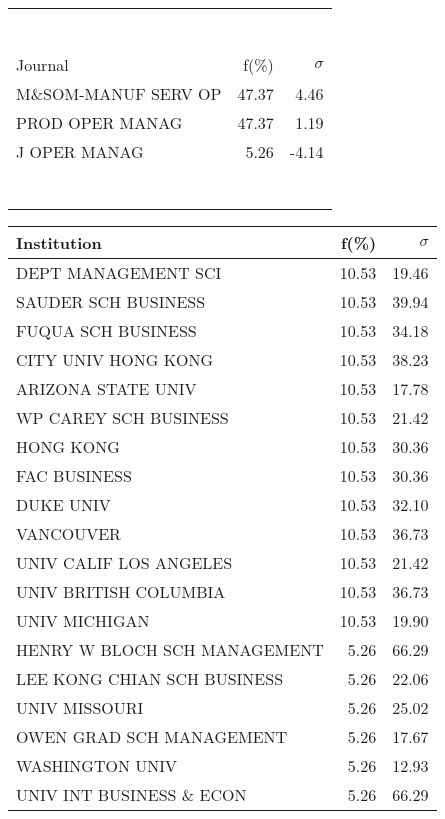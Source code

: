 \documentclass[a4paper,11pt]{report}
\begin{document}
\begin{landscape}
\begin{table}[!ht]
{\begin{tabular}{|l r  r|}
 &  & \\
 &  & \\
 &  & \\
 &  & \\
 &  & \\
 &  & \\
 &  & \\
\hline
\hline
Journal & f(\%) & $\sigma$\\
\hline
M\&SOM-MANUF SERV OP & 47.37 & 4.46\\
PROD OPER MANAG & 47.37 & 1.19\\
J OPER MANAG & 5.26 & -4.14\\
 &  & \\
 &  & \\
 &  & \\
 &  & \\
 &  & \\
 &  & \\
 &  & \\
\hline
\end{tabular}
}
{\scriptsize\begin{tabular}{|l r r|}
\hline
Institution & f(\%) & $\sigma$\\
\hline
DEPT MANAGEMENT SCI & 10.53 & 19.46\\
SAUDER SCH BUSINESS & 10.53 & 39.94\\
FUQUA SCH BUSINESS & 10.53 & 34.18\\
CITY UNIV HONG KONG & 10.53 & 38.23\\
ARIZONA STATE UNIV & 10.53 & 17.78\\
WP CAREY SCH BUSINESS & 10.53 & 21.42\\
HONG KONG & 10.53 & 30.36\\
FAC BUSINESS & 10.53 & 30.36\\
DUKE UNIV & 10.53 & 32.10\\
VANCOUVER & 10.53 & 36.73\\
UNIV CALIF LOS ANGELES & 10.53 & 21.42\\
UNIV BRITISH COLUMBIA & 10.53 & 36.73\\
UNIV MICHIGAN & 10.53 & 19.90\\
HENRY W BLOCH SCH MANAGEMENT & 5.26 & 66.29\\
LEE KONG CHIAN SCH BUSINESS & 5.26 & 22.06\\
UNIV MISSOURI & 5.26 & 25.02\\
OWEN GRAD SCH MANAGEMENT & 5.26 & 17.67\\
WASHINGTON UNIV & 5.26 & 12.93\\
UNIV INT BUSINESS \& ECON & 5.26 & 66.29\\

\end{tabular}}
\end{table}
\end{landscape}
\end{document}
